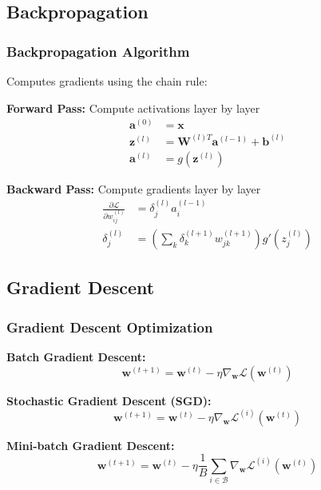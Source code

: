 \documentclass{beamer}
\begin{document}
\subsection{Backpropagation}
\begin{frame}
\frametitle{Backpropagation Algorithm}
Computes gradients using the chain rule:

\textbf{Forward Pass:} Compute activations layer by layer
\begin{align}
\boldsymbol{a}^{(0)} &= \boldsymbol{x} \\
\boldsymbol{z}^{(l)} &= \boldsymbol{W}^{(l)T}\boldsymbol{a}^{(l-1)} + \boldsymbol{b}^{(l)} \\
\boldsymbol{a}^{(l)} &= g(\boldsymbol{z}^{(l)})
\end{align}

\textbf{Backward Pass:} Compute gradients layer by layer
\begin{align}
\frac{\partial \mathcal{L}}{\partial w_{ij}^{(l)}} &= \delta_j^{(l)} a_i^{(l-1)} \\
\delta_j^{(l)} &= \left(\sum_{k} \delta_k^{(l+1)} w_{jk}^{(l+1)}\right) g'(z_j^{(l)})
\end{align}
\end{frame}

\subsection{Gradient Descent}
\begin{frame}
\frametitle{Gradient Descent Optimization}
\textbf{Batch Gradient Descent:}
\begin{equation}
\boldsymbol{w}^{(t+1)} = \boldsymbol{w}^{(t)} - \eta \nabla_{\boldsymbol{w}} \mathcal{L}(\boldsymbol{w}^{(t)})
\end{equation}

\textbf{Stochastic Gradient Descent (SGD):}
\begin{equation}
\boldsymbol{w}^{(t+1)} = \boldsymbol{w}^{(t)} - \eta \nabla_{\boldsymbol{w}} \mathcal{L}^{(i)}(\boldsymbol{w}^{(t)})
\end{equation}

\textbf{Mini-batch Gradient Descent:}
\begin{equation}
\boldsymbol{w}^{(t+1)} = \boldsymbol{w}^{(t)} - \eta \frac{1}{B} \sum_{i \in \mathcal{B}} \nabla_{\boldsymbol{w}} \mathcal{L}^{(i)}(\boldsymbol{w}^{(t)})
\end{equation}
\end{frame}
\end{document}
